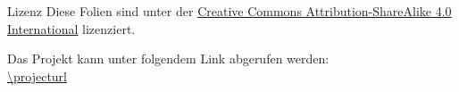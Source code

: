 
\begin{frame}{Lizenz}
    Diese Folien sind unter der \href{https://creativecommons.org/licenses/by-sa/4.0/}{Creative Commons Attribution-ShareAlike 4.0 International} lizenziert. \ccbysa
    
    Das Projekt kann unter folgendem Link abgerufen werden:\\
    \url{\projecturl}
\end{frame}
